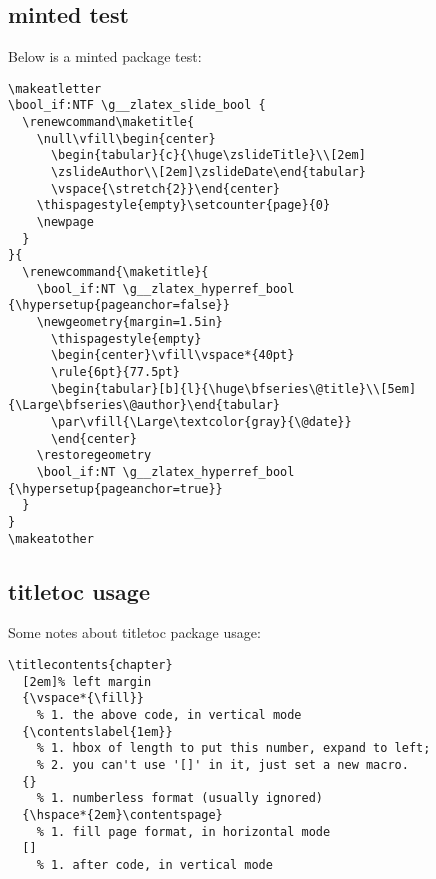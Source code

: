 \documentclass[
  hyper, fancy,
  class=book,
]{zlatex}
\begin{document}
\subsection{minted test}
Below is a minted package test:
\begin{verbatim}
\makeatletter
\bool_if:NTF \g__zlatex_slide_bool {
  \renewcommand\maketitle{
    \null\vfill\begin{center}
      \begin{tabular}{c}{\huge\zslideTitle}\\[2em]
      \zslideAuthor\\[2em]\zslideDate\end{tabular}
      \vspace{\stretch{2}}\end{center}
    \thispagestyle{empty}\setcounter{page}{0}
    \newpage
  }
}{
  \renewcommand{\maketitle}{
    \bool_if:NT \g__zlatex_hyperref_bool {\hypersetup{pageanchor=false}}
    \newgeometry{margin=1.5in}
      \thispagestyle{empty}
      \begin{center}\vfill\vspace*{40pt}
      \rule{6pt}{77.5pt}
      \begin{tabular}[b]{l}{\huge\bfseries\@title}\\[5em]{\Large\bfseries\@author}\end{tabular}
      \par\vfill{\Large\textcolor{gray}{\@date}}
      \end{center}
    \restoregeometry
    \bool_if:NT \g__zlatex_hyperref_bool {\hypersetup{pageanchor=true}}
  }
}
\makeatother
\end{verbatim}

\subsection{titletoc usage}
Some notes about titletoc package usage:
\begin{verbatim}
\titlecontents{chapter}
  [2em]% left margin
  {\vspace*{\fill}}
    % 1. the above code, in vertical mode
  {\contentslabel{1em}}
    % 1. hbox of length to put this number, expand to left; 
    % 2. you can't use '[]' in it, just set a new macro.
  {}
    % 1. numberless format (usually ignored)
  {\hspace*{2em}\contentspage}
    % 1. fill page format, in horizontal mode
  []
    % 1. after code, in vertical mode
\end{verbatim}
\end{document}
